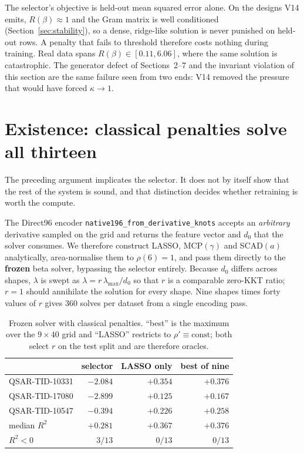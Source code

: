 \documentclass[11pt]{article}
\newcommand{\Rq}{R(\beta)}
\begin{document}
The selector's objective is held-out mean squared error alone. On the designs
V14 emits, $\Rq \approx 1$ and the Gram matrix is well conditioned
(Section~\ref{sec:stability}), so a dense, ridge-like solution is never
punished on held-out rows. A penalty that fails to threshold therefore costs
nothing during training. Real data spans $\Rq \in [0.11, 6.06]$, where the
same solution is catastrophic. The generator defect of Sections~2--7 and the
invariant violation of this section are the same failure seen from two ends:
V14 removed the pressure that would have forced $\kappa \to 1$.

\section{Existence: classical penalties solve all thirteen}
\label{sec:family}

The preceding argument implicates the selector. It does not by itself show
that the rest of the system is sound, and that distinction decides whether
retraining is worth the compute.

The Direct96 encoder \texttt{native196\_from\_derivative\_knots} accepts an
\emph{arbitrary} derivative sampled on the grid and returns the feature vector
and $d_0$ that the solver consumes. We therefore construct LASSO, MCP$(\gamma)$
and SCAD$(a)$ analytically, area-normalise them to $\rho(6)=1$, and pass them
directly to the \textbf{frozen} beta solver, bypassing the selector entirely.
Because $d_0$ differs across shapes, $\lambda$ is swept as
$\lambda = r\,\lambda_{\max}/d_0$ so that $r$ is a comparable zero-KKT ratio;
$r = 1$ should annihilate the solution for every shape. Nine shapes times
forty values of $r$ gives $360$ solves per dataset from a single encoding pass.

\begin{table}[h]
\centering
\caption{Frozen solver with classical penalties. ``best'' is the maximum over
the $9 \times 40$ grid and ``LASSO'' restricts to $\rho' \equiv \mathrm{const}$;
both select $r$ on the test split and are therefore oracles.}
\label{tab:family}
\begin{tabular}{@{}lrrr@{}}
\toprule
 & selector & LASSO only & best of nine \\
\midrule
QSAR-TID-10331 & $-2.084$ & $+0.354$ & $+0.376$ \\
QSAR-TID-17080 & $-2.899$ & $+0.125$ & $+0.167$ \\
QSAR-TID-10547 & $-0.394$ & $+0.226$ & $+0.258$ \\
\midrule
median $R^2$   & $+0.281$ & $+0.367$ & $+0.376$ \\
$R^2 < 0$      & $3/13$   & $0/13$   & $0/13$ \\
\bottomrule
\end{tabular}
\end{table}
\end{document}
